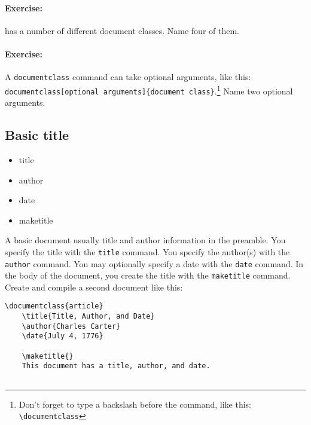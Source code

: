         \paragraph{Exercise:}\LaTeXe{} has a number of different document classes. Name four of them.

        \paragraph{Exercise:}A \texttt{documentclass} command can take optional arguments, like this: \texttt{documentclass[optional arguments]\{document class\}}.\footnote{Don't forget to type a backslash before the command, like this: \texttt{\textbackslash{}documentclass}} Name two optional arguments.

        \subsection{Basic title}
        \label{Basic-title}
        
        \begin{framed}
            \begin{itemize}
                \item{title}
                \item{author}
                \item{date}
                \item{maketitle}
            \end{itemize}
        \end{framed}

        A basic document usually title and author information in the preamble. You specify the title with the \texttt{title} command. You specify the author(s) with the \texttt{author} command. You may optionally specify a date with the \texttt{date} command. In the body of the document, you create the title with the \texttt{maketitle} command. Create and compile a second document like this:        

        \begin{verbatim}
\documentclass{article}
    \title{Title, Author, and Date}
    \author{Charles Carter}
    \date{July 4, 1776}
 
    \maketitle{}
    This document has a title, author, and date.
    
        \end{verbatim}

